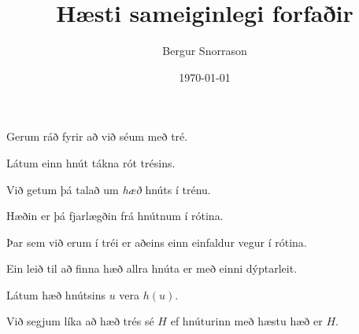 \title{Hæsti sameiginlegi forfaðir}
\author{Bergur Snorrason}
\date{\today}



\frame{\titlepage}

{
	{
		\item<1-> Gerum ráð fyrir að við séum með tré.
		\item<2-> Látum einn hnút tákna rót trésins.
		\item<3-> Við getum þá talað um \emph{hæð} hnúts í trénu.
		\item<4-> Hæðin er þá fjarlægðin frá hnútnum í rótina.
		\item<5-> Þar sem við erum í tréi er aðeins einn einfaldur vegur í rótina.
		\item<6-> Ein leið til að finna hæð allra hnúta er með einni dýptarleit.
		\item<7-> Látum hæð hnútsins $u$ vera $h(u)$.
		\item<8-> Við segjum líka að hæð trés sé $H$ ef hnúturinn með hæstu hæð er $H$.
	}
}

